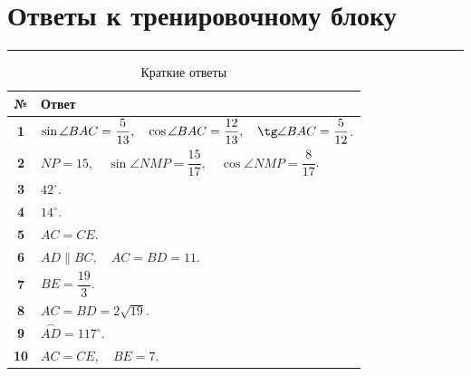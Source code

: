 \documentclass[a4paper,12pt]{article}
\newcommand{\sectionrule}{
  \par
  \vspace{0.2em}
  \noindent
  \textcolor{accent}{\rule{\linewidth}{0.7pt}}
  \vspace{0.35em}
}
\begin{document}

\newpage

\section*{Ответы к тренировочному блоку}
\sectionrule

\renewcommand{\arraystretch}{1.35}

\begin{table}[h!]
\centering
\caption{Краткие ответы}

\begin{tabularx}{\linewidth}{@{}>{\bfseries}c X@{}}

\toprule
№ & Ответ \\
\midrule

1 &
\(
\sin\angle BAC=\dfrac{5}{13},
\quad
\cos\angle BAC=\dfrac{12}{13},
\quad
\tg\angle BAC=\dfrac{5}{12}
\).
\\

2 &
\(
NP=15,
\quad
\sin\angle NMP=\dfrac{15}{17},
\quad
\cos\angle NMP=\dfrac{8}{17}
\).
\\

3 &
\(
42^\circ
\).
\\

4 &
\(
14^\circ
\).
\\

5 &
\(
AC=CE
\).
\\

6 &
\(
AD\parallel BC,
\quad
AC=BD=11
\).
\\

7 &
\(
BE=\dfrac{19}{3}
\).
\\

8 &
\(
AC=BD=2\sqrt{19}
\).
\\

9 &
\(
\overset{\frown}{AD}=117^\circ
\).
\\

10 &
\(
AC=CE,
\quad
BE=7
\).
\\

\bottomrule

\end{tabularx}
\end{table}
\end{document}
